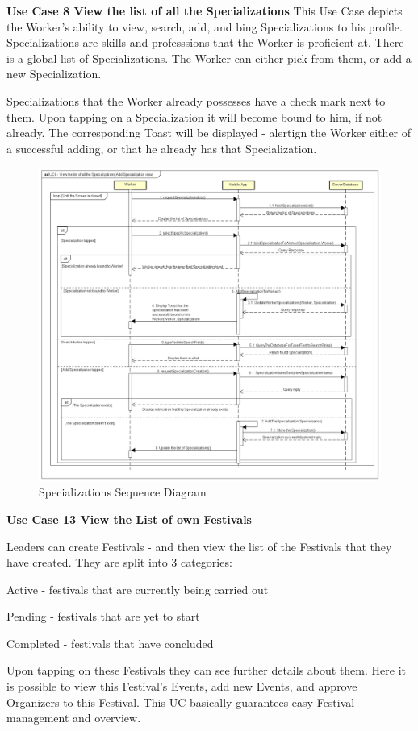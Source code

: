 				\textbf{Use Case 8 View the list of all the Specializations}
				This Use Case depicts the Worker's ability to view, search, add, and bing Specializations to his profile. Specializations are skills and professsions that the Worker is proficient at. There is a global list of Specializations. The Worker can either pick from them, or add a new Specialization.
				
				Specializations that the Worker already possesses have a check mark next to them. Upon tapping on a Specialization it will become bound to him, if not already. The corresponding Toast will be displayed - alertign the Worker either of a successful adding, or that he already has that Specialization. 
				\begin{figure}[H]
					\includegraphics[width=\linewidth]{diagrams/UC8 - View the list of all the Specializations.png}
					\caption{Specializations Sequence Diagram}
					\label{fig:sd_uc8_job_activities}
				\end{figure}
			
				
				\textbf{Use Case 13 View the List of own Festivals}
				
				Leaders can create Festivals - and then view the list of the Festivals that they have created. They are split into 3 categories:
				\begin{packed_enum}
					\item Active - festivals that are currently being carried out
					\item Pending - festivals that are yet to start
					\item Completed - festivals that have concluded
				\end{packed_enum}
				Upon tapping on these Festivals they can see further details about them. Here it is possible to view this Festival's Events, add new Events, and approve Organizers to this Festival. This UC basically guarantees easy Festival management and overview.

